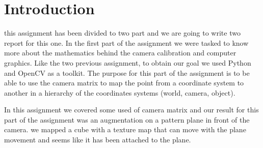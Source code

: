 \pagebreak{}
\section{Introduction}

this assignment has been divided to two part and we are going to write two report for this one. In the first part of the assignment we were tasked to know more about the mathematics behind the camera calibration and computer graphics. Like the two previous assignment, to obtain our goal we used Python and OpenCV as a toolkit. The purpose for this part of the assignment is to be able to use the camera matrix to map the point from a coordinate system to another in a hierarchy of the coordinates systems (world, camera, object).

In this assignment we covered some used of camera matrix and our result for this part of the assignment was an augmentation on a pattern plane in front of the camera. we mapped a cube with a texture map that can move with the plane movement and seems like it has been attached to the plane.
